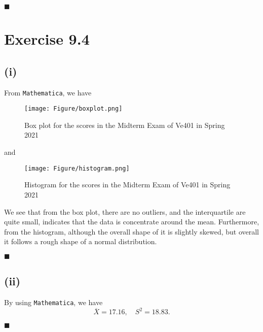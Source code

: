 \documentclass[13pt]{article}
\newcommand{\myqed}{\hfill$\blacksquare$}
\begin{document}
\myqed

\newpage
\section*{Exercise 9.4}
\subsection*{(i)}
\par From {\tt Mathematica}, we have 
\begin{figure}[H]
    \centering
    \texttt{[image: Figure/boxplot.png]}
    \caption*{Box plot for the scores in the Midterm Exam of Ve401 in Spring 2021}
\end{figure}
and 
\begin{figure}[H]
    \centering
    \texttt{[image: Figure/histogram.png]}
    \caption*{Histogram for the scores in the Midterm Exam of Ve401 in Spring 2021}
\end{figure}

\par We see that from the box plot, there are no outliers, and the interquartile are quite small, indicates that the data is concentrate 
around the mean. Furthermore, from the histogram, although the overall shape of it is slightly skewed, but overall it follows a rough shape
of a normal distribution.

\myqed

\subsection*{(ii)}
\par By using {\tt Mathematica}, we have 
\begin{equation*}
    \overline{X} = 17.16, \quad S^2 = 18.83.
\end{equation*}

\myqed

\end{document}

